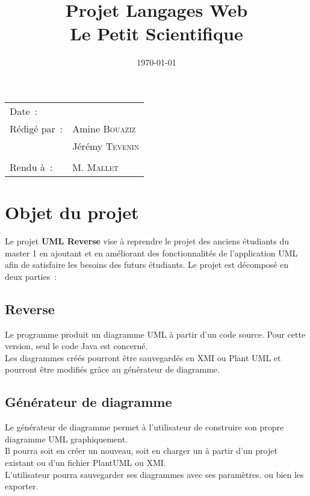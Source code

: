 \documentclass[hidelinks, 10pt,a4paper]{article}
\title{\bfseries Projet Langages Web\\Le Petit Scientifique}
\begin{document}
\maketitle
\begin{center}
\begin{tabular}{ll}
  Date~: & \date{\today}\\[.5em]
  Rédigé par~: & Amine \textsc{Bouaziz}\\
               & Jérémy \textsc{Tevenin}\\
               &\\[.5em]
  Rendu à~: & M. \textsc{Mallet}\\[.5em]
\end{tabular}
\end{center}

\newpage
\tableofcontents

\newpage
\section{Objet du projet}
Le projet \textbf{UML Reverse} vise à reprendre le projet des anciens étudiants du master 1 en ajoutant et en améliorant des fonctionnalités de l'application UML
afin de satisfaire les besoins des futurs étudiants. Le projet est décomposé en deux parties~:

\subsection{Reverse}
Le programme produit un diagramme UML à partir d’un code source. Pour cette version, seul le code Java est concerné.\\
Les diagrammes créés pourront être sauvegardés en XMI ou Plant UML et pourront être modifiés grâce au générateur de diagramme.\\

\subsection{Générateur de diagramme}
Le générateur de diagramme permet à l’utilisateur de construire son propre diagramme UML graphiquement. \\
Il pourra soit en créer un nouveau, soit en charger un à partir d'un projet existant ou d’un fichier PlantUML ou XMI.\\
L’utilisateur pourra sauvegarder ses diagrammes avec ses paramètres. ou bien les exporter.\\
\end{document}
